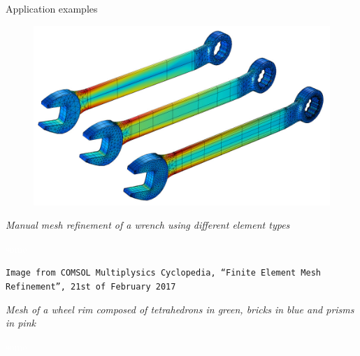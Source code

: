 \documentclass[10pt,externalviewer]{beamer}
\begin{document}
\begin{frame}{Application examples}
   \begin{minipage}{0.5\textwidth}
      \begin{figure}[H]
         \raggedright
         \includegraphics[width=\textwidth]{Immagini/mesh-application-1.jpeg}
      \end{figure}
   \end{minipage}
   \hfill
   \begin{minipage}{0.45\textwidth}
      \footnotesize{\textit{Manual mesh refinement of a wrench using different element types}}

      \textcolor{white}{some}

      \tiny{\texttt{Image from COMSOL Multiplysics Cyclopedia, ``Finite Element Mesh Refinement'', 21st of February 2017}}
   \end{minipage}

   \vfill

   \begin{minipage}{0.425\textwidth}
      \footnotesize{\textit{Mesh of a wheel rim composed of tetrahedrons in green, bricks in blue and prisms in pink}}

      \textcolor{white}{some}


\end{minipage}
\end{frame}
\end{document}
